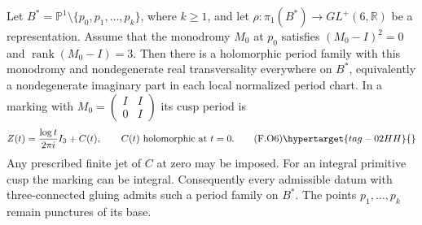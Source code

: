 \begin{theorem}\hypertarget{tag-02O3}{}\label{maps:src:F.3.11}


Let
$B^*=\mathbb P^1\setminus\{p_0,p_1,\ldots,p_k\}$,
where $k\ge1$, and let
$\rho:\pi_1(B^*)\to GL^+(6,\mathbb R)$ be a representation.
Assume that the monodromy $M_0$ at $p_0$ satisfies
$(M_0-I)^2=0$ and $\operatorname{rank}(M_0-I)=3$.
Then there is a holomorphic period family with this monodromy
and nondegenerate real transversality everywhere on $B^*$,
equivalently a nondegenerate imaginary part in each local
normalized period chart.
In a marking with $M_0=\left(\begin{smallmatrix}I&I\\0&I\end{smallmatrix}\right)$
its cusp period is
\[
 Z(t)=\frac{\log t}{2\pi i}I_3+C(t),
 \qquad C(t)\text{ holomorphic at }t=0.
 \tag{F.O6}\hypertarget{tag-02HH}{}\label{maps:eq:F.O6}
\]
Any prescribed finite jet of $C$ at zero may be imposed.
For an integral primitive cusp the marking can be integral.
Consequently every admissible datum with three-connected gluing
admits such a period family on $B^*$. The points
$p_1,\ldots,p_k$ remain punctures of its base.

\end{theorem}


